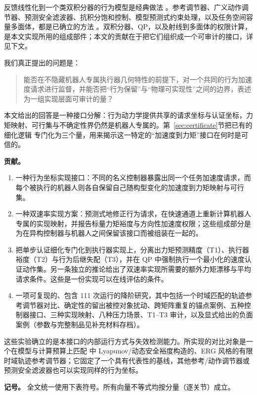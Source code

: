 \documentclass[journal]{IEEEtran}
\begin{document}
反馈线性化到一个类双积分器的行为模型是经典做法 \cite{r1,r2}。参考调节器、广义动作调节器、预测安全滤波器、抗积分饱和控制、模型预测式约束处理，以及任务空间容量多面体，都是已确立的方法 \cite{r3,r4,r5,r6,r7,r16,r17,r18,r19,r20}。双积分器、QP，以及射线到多面体的权限计算，是本文实现所用的组成部件；本文的贡献在于把它们组织成一个可审计的接口，详见下文。

我们真正提出的问题是：

\begin{quote}
能否在不隐藏机器人专属执行器几何特性的前提下，对一个共同的行为加速度请求进行监督，并能否把“行为保留”与“物理可实现性”之间的边界，表述为一组实现层面可审计的量？
\end{quote}

本文给出的回答是一种接口分解：行为动力学提供共享的请求坐标与认证坐标，力矩映射、可行集与不确定性界仍然是机器人专属的。第~\ref{sec:certificate}节把已有的细化逻辑 \cite{r8,r9,r19} 专门化为三个量，用来揭示这一特定的“加速度到力矩”接口在何时是可信的。

\textbf{贡献。}
\begin{enumerate}
\item 一种行为坐标实现接口：不同的名义控制器暴露出同一个任务加速度请求，而每个被执行的机器人则各自保留自己随构型变化的加速度到力矩映射与可行集。
\item 一种双速率实现方案：预测式地修正行为请求，在快速通道上重新计算机器人专属的实现映射，并报告标量力矩裕度与方向性加速度权限；这些组成部分是为在异构控制器与机器人之间保留该接口而被组装在一起的。
\item 把单步认证细化专门化到执行器实现上，分离出力矩预测精度（T1）、执行器裕度（T2）与行为后继失配（T3），并在 QP 中强制执行一个最小化的速度认证动作集。另一条独立的推论给出了双速率实现所需要的额外力矩漂移与平均请求条件。这些是一份实现可以在线评估的条件。
\item 一项可复现的、包含 111 次运行的降阶研究，其中包括一个时域匹配的轨迹参考调节器对比、确定性的留出被控对象扰动、跨矩阵重复的锚点案例、五种控制器接口、三种实现映射、八种压力场景、T1--T3 审计，以及显式给出的负面案例（参数与完整制品见补充材料存档）。
\end{enumerate}

这些实验确立的是本接口的内部运行方式与失效检测能力。所实现的对比对象是一个在模型与计算预算上匹配 \cite{r17} 中 Lyapunov/动态安全裕度构造的、ERG 风格的有限时域轨迹参考调节器；它固定了一个具有代表性的基线，其他参考/动作调节器或预测安全滤波器也可以实现同样的行为坐标。

\textbf{记号。} 全文统一使用下表符号。所有向量不等式均按分量（逐关节）成立。
\end{document}
